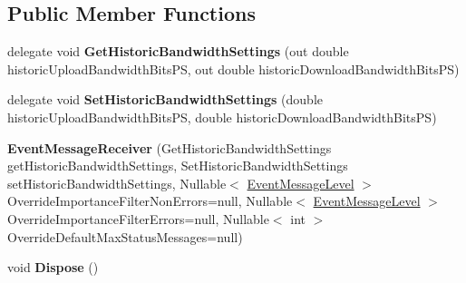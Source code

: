 \subsection*{Public Member Functions}
\begin{DoxyCompactItemize}
\item 
\hypertarget{class_cloud_api_public_1_1_event_message_receiver_1_1_event_message_receiver_a68dbda3ee375a1c953c3a3e4fe5a8334}{delegate void {\bfseries Get\-Historic\-Bandwidth\-Settings} (out double historic\-Upload\-Bandwidth\-Bits\-P\-S, out double historic\-Download\-Bandwidth\-Bits\-P\-S)}\label{class_cloud_api_public_1_1_event_message_receiver_1_1_event_message_receiver_a68dbda3ee375a1c953c3a3e4fe5a8334}

\item 
\hypertarget{class_cloud_api_public_1_1_event_message_receiver_1_1_event_message_receiver_afd8ef0a309c7f9e241c8bbc244b819a2}{delegate void {\bfseries Set\-Historic\-Bandwidth\-Settings} (double historic\-Upload\-Bandwidth\-Bits\-P\-S, double historic\-Download\-Bandwidth\-Bits\-P\-S)}\label{class_cloud_api_public_1_1_event_message_receiver_1_1_event_message_receiver_afd8ef0a309c7f9e241c8bbc244b819a2}

\item 
\hypertarget{class_cloud_api_public_1_1_event_message_receiver_1_1_event_message_receiver_aa4d559c99e25795209d333b725804ac9}{{\bfseries Event\-Message\-Receiver} (Get\-Historic\-Bandwidth\-Settings get\-Historic\-Bandwidth\-Settings, Set\-Historic\-Bandwidth\-Settings set\-Historic\-Bandwidth\-Settings, Nullable$<$ \hyperlink{namespace_cloud_api_public_1_1_static_aafffc00af8d280bc613cd0a306f52a6b}{Event\-Message\-Level} $>$ Override\-Importance\-Filter\-Non\-Errors=null, Nullable$<$ \hyperlink{namespace_cloud_api_public_1_1_static_aafffc00af8d280bc613cd0a306f52a6b}{Event\-Message\-Level} $>$ Override\-Importance\-Filter\-Errors=null, Nullable$<$ int $>$ Override\-Default\-Max\-Status\-Messages=null)}\label{class_cloud_api_public_1_1_event_message_receiver_1_1_event_message_receiver_aa4d559c99e25795209d333b725804ac9}

\item 
\hypertarget{class_cloud_api_public_1_1_event_message_receiver_1_1_event_message_receiver_aec1cf65af718c9bc660ae7eb1b48dabf}{void {\bfseries Dispose} ()}\label{class_cloud_api_public_1_1_event_message_receiver_1_1_event_message_receiver_aec1cf65af718c9bc660ae7eb1b48dabf}

\end{DoxyCompactItemize}
